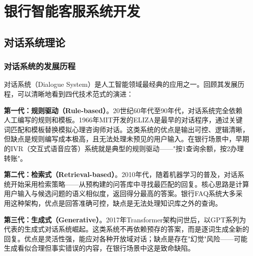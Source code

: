 
\chapter{银行智能客服系统开发}


\section{对话系统理论}

\subsection{对话系统的发展历程}

对话系统（Dialogue System）是人工智能领域最经典的应用之一。回顾其发展历程，可以清晰地看到四代技术范式的演进：

\textbf{第一代：规则驱动（Rule-based）}。20世纪60年代至90年代，对话系统完全依赖人工编写的规则和模板。1966年MIT开发的ELIZA是最早的对话程序，通过关键词匹配和模板替换模拟心理咨询师对话。这类系统的优点是输出可控、逻辑清晰，但缺点是规则编写成本极高，且无法处理未预见的用户输入。在银行场景中，早期的IVR（交互式语音应答）系统就是典型的规则驱动——"按1查询余额，按2办理转账"。

\textbf{第二代：检索式（Retrieval-based）}。2010年代，随着机器学习的普及，对话系统开始采用检索策略——从预构建的问答库中寻找最匹配的回复。核心思路是计算用户输入与候选问题的语义相似度，返回得分最高的答案。银行FAQ系统大多采用这种架构，优点是回答准确可控，缺点是无法处理知识库之外的查询。

\textbf{第三代：生成式（Generative）}。2017年Transformer架构问世后，以GPT系列为代表的生成式对话系统崛起。这类系统不再依赖预存的答案，而是逐词生成全新的回复。优点是灵活性强，能应对各种开放域对话；缺点是存在"幻觉"风险——可能生成看似合理但事实错误的内容，在银行场景中这是致命缺陷。

